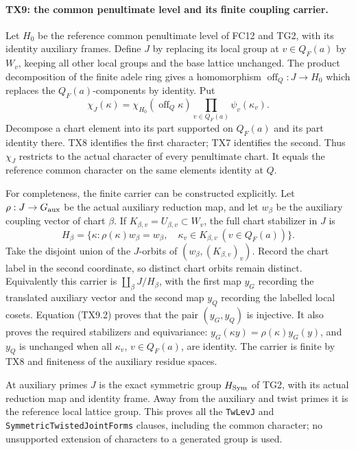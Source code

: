 \paragraph{TX9: the common penultimate level and its finite coupling carrier.}
Let \(H_0\) be the reference common penultimate level of FC12 and
TG2, with its identity auxiliary frames. Define \(J\) by replacing
its local group at \(v\in Q_F(a)\) by \(W_v\), keeping all other
local groups and the base lattice unchanged. The product
decomposition of the finite adele ring gives a homomorphism
\(\operatorname{off}_Q:J\to H_0\) which replaces the
\(Q_F(a)\)-components by identity. Put
\[
 \chi_J(\kappa)=
       \chi_{H_0}(\operatorname{off}_Q\kappa)
       \prod_{v\in Q_F(a)}\psi_v(\kappa_v).
 \tag{TX9.1}
\]
Decompose a chart element into its part supported on \(Q_F(a)\)
and its part identity there. TX8 identifies the first character;
TX7 identifies the second. Thus \(\chi_J\) restricts to the
actual character of every penultimate chart. It equals the
reference common character on the same elements identity at \(Q\).

For completeness, the finite carrier can be constructed explicitly.
Let \(\rho:J\to G_{\rm aux}\) be the actual auxiliary reduction
map, and let \(w_\beta\) be the auxiliary coupling vector of
chart \(\beta\). If \(K_{\beta,v}=U_{\beta,v}\subset W_v\),
the full chart stabilizer in \(J\) is
\[
 H_\beta=\{\kappa:
       \rho(\kappa)w_\beta=w_\beta,\quad
       \kappa_v\in K_{\beta,v}\ (v\in Q_F(a))\}.
 \tag{TX9.2}
\]
Take the disjoint union of the \(J\)-orbits of
\((w_\beta,(K_{\beta,v})_v)\). Record the chart label in the
second coordinate, so distinct chart orbits remain distinct.
Equivalently this carrier is \(\coprod_\beta J/H_\beta\), with
the first map \(y_G\) recording the translated auxiliary vector
and the second map \(y_Q\) recording the labelled local cosets.
Equation (TX9.2) proves that the pair \((y_G,y_Q)\) is injective.
It also proves the required stabilizers and equivariance:
\(y_G(\kappa y)=\rho(\kappa)y_G(y)\), and \(y_Q\) is unchanged
when all \(\kappa_v\), \(v\in Q_F(a)\), are identity.
The carrier is finite by TX8 and finiteness of the auxiliary
residue spaces.

At auxiliary primes \(J\) is the exact symmetric group
\(H_{\rm Sym}\) of TG2, with its actual reduction map and
identity frame. Away from the auxiliary and twist primes it
is the reference local lattice group. This proves all the
\texttt{TwLevJ} and \texttt{SymmetricTwistedJointForms} clauses,
including the common character; no unsupported extension of
characters to a generated group is used.

